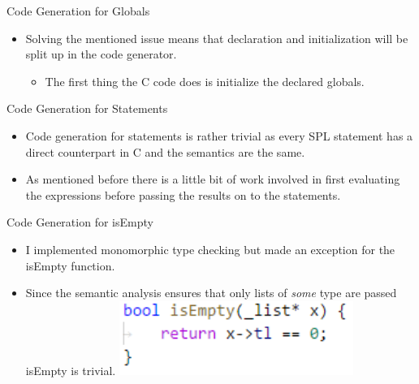 \documentclass[10pt]{beamer}
\begin{document}
\begin{frame}{Code Generation for Globals}
    \begin{itemize}
        \item Solving the mentioned issue means that declaration and initialization will be split up in the code generator.
        \begin{itemize}
            \item The first thing the C code does is initialize the declared globals.
        \end{itemize}
    \end{itemize}
\end{frame}

\begin{frame}{Code Generation for Statements}
    \begin{itemize}
        \item Code generation for statements is rather trivial as every SPL statement has a direct counterpart in C and the semantics are the same.
        \item As mentioned before there is a little bit of work involved in first evaluating the expressions before passing the results on to the statements.
    \end{itemize}
\end{frame}

\begin{frame}{Code Generation for isEmpty}
    \begin{itemize}
        \item I implemented monomorphic type checking but made an exception for the isEmpty function.
        \item Since the semantic analysis ensures that only lists of \textit{some} type are passed isEmpty is trivial.
        \includegraphics[width=0.6\textwidth]{presentation4/6.png}
    \end{itemize}
\end{frame}
\end{document}
